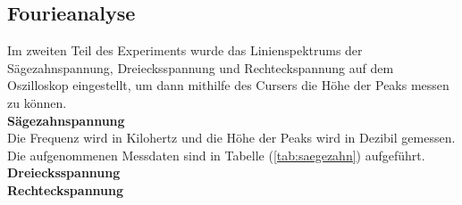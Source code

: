 \subsection{Fourieanalyse}
Im zweiten Teil des Experiments wurde das Linienspektrums der Sägezahnspannung, Dreiecksspannung und Rechteckspannung auf dem Oszilloskop eingestellt, um dann 
mithilfe des Cursers die Höhe der Peaks messen zu können. \\
\textbf{Sägezahnspannung} \\
Die Frequenz wird in Kilohertz und die Höhe der Peaks wird in Dezibil gemessen. Die aufgenommenen Messdaten sind in Tabelle (\ref{tab:saegezahn}) aufgeführt. 
\textbf{Dreiecksspannung} \\
\textbf{Rechteckspannung} \\





